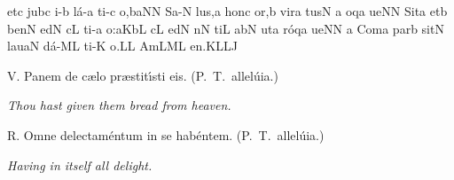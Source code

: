 \spatium
\sgn {}et\punctum c\egn
\spatium
\sgn jub\punctum c\egn
\sgn {}i{-}\punctum b\egn
\sgn l{\'a}{-}\punctum a\egn
\sgn ti{-}\punctum c\egn
\sgn {}o{,}\climacus baN\augmentum N\egn
\spatium
\divisiominor
\spatium
\sgn S{a}{-}\punctum N\egn
\sgn lu{s,}\punctum a\egn
\spatium
\sgn h{o}n\punctum c\egn
\sgn {}o{r,}\punctum b\egn
\spatium
\sgn v{i}r\punctum a\egn
\sgn tus\punctum N\egn
\spatium
\custos a
\lineaproxima
{}oq\punctum a\egn
\sgn ue{}\punctum N\augmentum N\egn
\spatium
\divisiominima
\spatium
\sgn Sit\punctum a\egn
\spatium
\sgn {}et\punctum b\egn
\spatium
\sgn ben\punctum N\egn
\sgn {}ed\punctum N\egn
\sgn {}{\'\i}c\punctum L\egn
\sgn ti{-}\punctum a\egn
\sgn {}o{:}\clivis aK\augmentumduplex bL\egn
\spatium
\divisiominor
\spatium
c\punctum L\egn
\sgn {}ed\punctum N\egn
{}n\punctum N\egn
\sgn ti{}\punctum L\egn
\spatium
\sgn {}ab\punctum N\egn
\spatium
\sgn {}ut\punctum a\egn
\sgn r{\'o}q\punctum a\egn
\sgn ue{}\punctum N\augmentum N\egn
\spatium
\divisiominima
\spatium
\custos a
\lineaproxima
\sgn C{o}m\punctum a\egn
\sgn par\punctum b\egn
\spatium
\sgn sit\punctum N\egn
\spatium
\sgn lau\clivis aN\egn
\sgn d{\'a}{-}\clivis ML\egn
\sgn ti{-}\punctum K\egn
\sgn {}o{.}\punctum L\augmentum L\egn
\spatium
\divisiofinalis
\spatium
\spatium
\sgn {}Am\torculus LML\egn
\sgn {}e{n.}\pes KL\augmentumduplex LJ\egn
\spatium
\Finisgregoriana



\bigskip


\goodbreak
\medskip

\s V. Panem de c\ae lo pr\ae stit\'\i sti eis. (P.~T.~allel\'uia.)

{\hskip35mm \it Thou hast given them bread from heaven.}

\smallskip

\s R. Omne delectam\'entum in se hab\'entem. (P.~T.~allel\'uia.)

{\hskip35mm \it Having in itself all delight.}

\goodbreak
\filbreak
\bigskip

